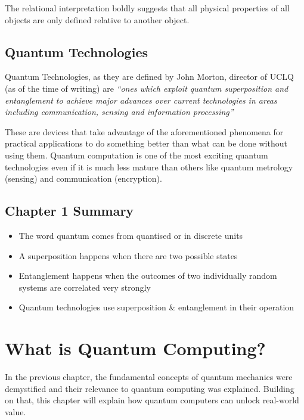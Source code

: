 \documentclass{book}
\begin{document}
The relational interpretation boldly suggests that all physical properties of all objects are only defined relative to another object. 

\section{Quantum Technologies}

Quantum Technologies, as they are defined by John Morton, director of UCLQ (as of the time of writing) are \textit{ ``ones which exploit quantum superposition and entanglement to achieve major advances over current technologies in areas including communication, sensing and information processing'' }

These are devices that take advantage of the aforementioned phenomena for practical applications to do something better than what can be done without using them. Quantum computation is one of the most exciting quantum technologies even if it is much less mature than others like quantum metrology (sensing) and communication (encryption).


\section{Chapter 1 Summary} 

\begin{itemize}

    \item The word quantum comes from quantised or in discrete units 
    \item A superposition happens when there are two possible states
    \item Entanglement happens when the outcomes of two individually random systems are correlated very strongly 
    \item Quantum technologies use superposition \& entanglement in their operation 
    
\end{itemize}

\chapter{What is Quantum Computing?}


In the previous chapter, the fundamental concepts of quantum mechanics were demystified and their relevance to quantum computing was explained. Building on that, this chapter will explain how quantum computers can unlock real-world value.
\end{document}
